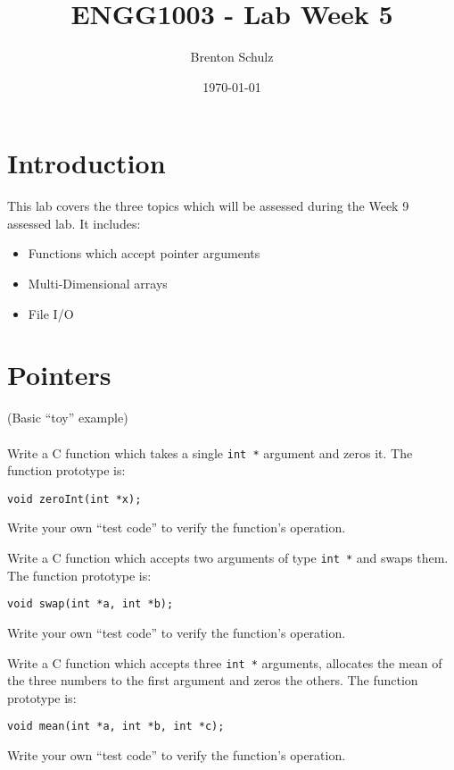 \documentclass{lab}
\title{ENGG1003 - Lab Week 5}
\author{Brenton Schulz}
\date{\today}
\begin{document}
\maketitle

\section{Introduction}

This lab covers the three topics which will be assessed during the Week 9 assessed lab. It includes:

\begin{itemize}
	\item Functions which accept pointer arguments
	\item Multi-Dimensional arrays
	\item File I/O
\end{itemize}

\section{Pointers}

\begin{task}{}{}
(Basic ``toy'' example)
\\~\\
Write a C function which takes a single \texttt{int *} argument and zeros it. The function prototype is:
\begin{lstlisting}[style=Ctable]
void zeroInt(int *x);
\end{lstlisting}

Write your own ``test code'' to verify the function's operation.
\end{task}

\begin{task}{}{}
Write a C function which accepts two arguments of type \texttt{int *} and swaps them. The function prototype is:

\begin{lstlisting}[style=Ctable]
void swap(int *a, int *b);
\end{lstlisting}

Write your own ``test code'' to verify the function's operation.
\end{task}

\begin{task}{}{}
Write a C function which accepts three \texttt{int *} arguments, allocates the mean of the three numbers to the first argument and zeros the others. The function prototype is:

\begin{lstlisting}[style=Ctable]
void mean(int *a, int *b, int *c);
\end{lstlisting}

Write your own ``test code'' to verify the function's operation.
\end{task}
\end{document}
